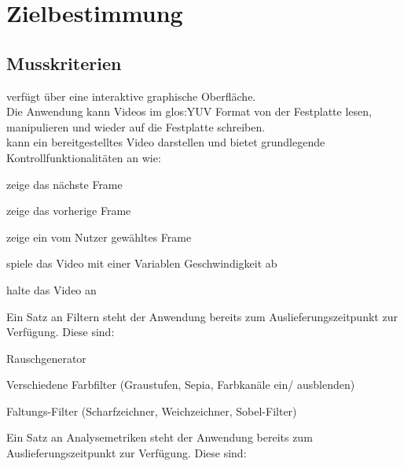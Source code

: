 \chapter{Zielbestimmung}

\section{Musskriterien}
\setcounter{counterKriterien}{0}
 \projektTitel verfügt über eine interaktive graphische Oberfläche.\\
 Die Anwendung kann Videos im \gls{glos:YUV} Format von der Festplatte lesen, manipulieren und wieder auf die Festplatte schreiben.\\
 \projektTitel kann ein bereitgestelltes Video darstellen und bietet grundlegende Kontrollfunktionalitäten an wie:
\begin{compactitem}
\item zeige das nächste Frame
\item zeige das vorherige Frame
\item zeige ein vom Nutzer gewähltes Frame
\item spiele das Video mit einer Variablen Geschwindigkeit ab
\item halte das Video an	
\end{compactitem} 
 Ein Satz an Filtern steht der Anwendung bereits zum Auslieferungszeitpunkt zur Verfügung. 
Diese sind:
\begin{compactitem}
\item Rauschgenerator
\item Verschiedene Farbfilter (Graustufen, Sepia, Farbkanäle ein/ ausblenden)
\item Faltungs-Filter (Scharfzeichner, Weichzeichner, Sobel-Filter)
\end{compactitem}
 Ein Satz an Analysemetriken steht der Anwendung bereits zum Auslieferungszeitpunkt zur Verfügung.
Diese sind:

